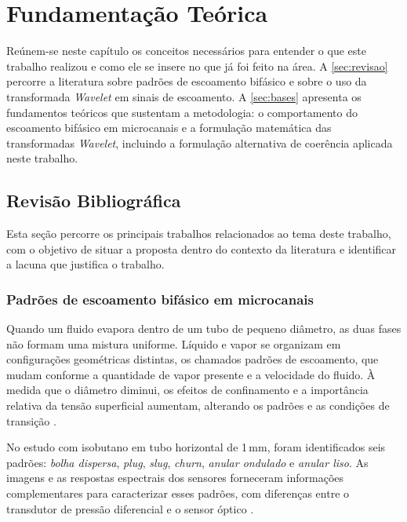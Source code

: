 \chapter{Fundamentação Teórica}\label{cap:fundamentacao}

Reúnem-se neste capítulo os conceitos necessários para entender o que este trabalho realizou e
como ele se insere no que já foi feito na área. A \autoref{sec:revisao} percorre a
literatura sobre padrões de escoamento bifásico e sobre o uso da transformada
\textit{Wavelet} em sinais de escoamento. A \autoref{sec:bases} apresenta os fundamentos
teóricos que sustentam a metodologia: o comportamento do escoamento bifásico em
microcanais e a formulação matemática das transformadas \textit{Wavelet}, incluindo a
formulação alternativa de coerência aplicada neste trabalho.

\section{Revisão Bibliográfica}\label{sec:revisao}

Esta seção percorre os principais trabalhos relacionados ao tema deste trabalho, com o
objetivo de situar a proposta dentro do contexto da literatura e identificar a lacuna
que justifica o trabalho.

\subsection{Padrões de escoamento bifásico em microcanais}\label{sec:rev-padroes}

Quando um fluido evapora dentro de um tubo de pequeno diâmetro, as duas fases não formam
uma mistura uniforme. Líquido e vapor se organizam em configurações geométricas distintas,
os chamados padrões de escoamento, que mudam conforme a quantidade de vapor presente e a
velocidade do fluido. À medida que o diâmetro diminui, os efeitos de confinamento e a
importância relativa da tensão superficial aumentam, alterando os padrões e as
condições de transição \cite{cheng2023}.

No estudo com isobutano em tubo horizontal de 1\,mm, foram identificados seis padrões:
\textit{bolha dispersa}, \textit{plug}, \textit{slug}, \textit{churn}, \textit{anular ondulado}
e \textit{anular liso}. As imagens e as respostas espectrais dos sensores forneceram
informações complementares para caracterizar esses padrões, com diferenças entre
o transdutor de pressão diferencial e o sensor óptico \cite{deoliveira2021}.

